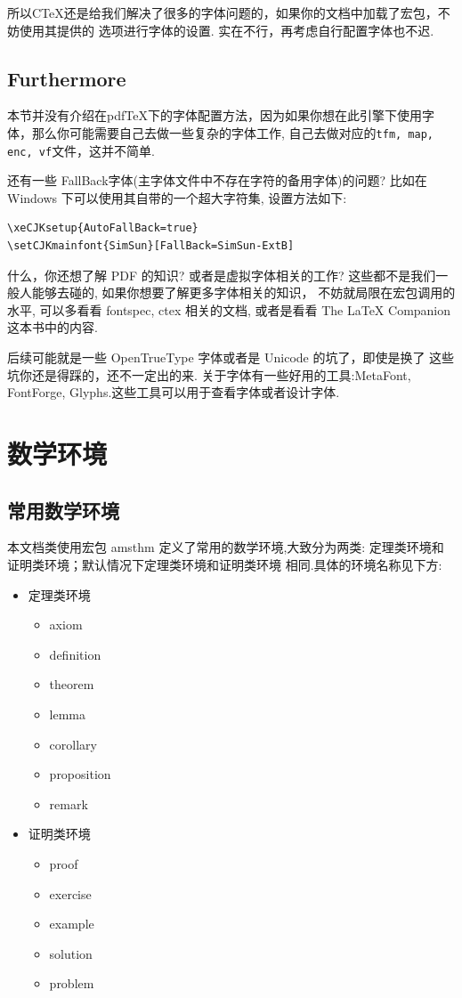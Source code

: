 所以C\TeX{}还是给我们解决了很多的字体问题的，如果你的文档中加载了宏包，不妨使用其提供的
选项进行字体的设置. 实在不行，再考虑自行配置字体也不迟.

\subsection{Furthermore}
本节并没有介绍在pdf\TeX{}下的字体配置方法，因为如果你想在此引擎下使用字体，那么你可能需要自己去做一些复杂的字体工作,
自己去做对应的\texttt{tfm, map, enc, vf}文件，这并不简单. 

还有一些 FallBack字体(主字体文件中不存在字符的备用字体)的问题? 比如在 Windows 下可以使用其自带的一个超大字符集,
设置方法如下:
\begin{verbatim}
\xeCJKsetup{AutoFallBack=true}
\setCJKmainfont{SimSun}[FallBack=SimSun-ExtB]
\end{verbatim}

什么，你还想了解 PDF 的知识? 或者是虚拟字体相关的工作? 这些都不是我们一般人能够去碰的, 如果你想要了解更多字体相关的知识，
不妨就局限在宏包调用的水平, 可以多看看 {fontspec, ctex} 相关的文档, 或者是看看 {The \LaTeX{} Companion} 这本书中的内容.

后续可能就是一些 OpenTrueType 字体或者是 Unicode 的坑了，即使是换了  这些坑你还是得踩的，还不一定出的来. 
关于字体有一些好用的工具:MetaFont, FontForge, Glyphs.这些工具可以用于查看字体或者设计字体.

\section{数学环境}
\subsection{常用数学环境}\label{常用数学环境}
本文档类使用宏包 {amsthm} 定义了常用的数学环境,大致分为两类: 定理类环境和证明类环境；默认情况下定理类环境和证明类环境
相同.具体的环境名称见下方:

\begin{itemize}
    \item 定理类环境
        \begin{itemize}
        \item axiom
        \item definition
        \item theorem 
        \item lemma
        \item corollary 
        \item proposition
        \item remark 
        \end{itemize}
    \item 证明类环境
    \begin{itemize}
        \item proof
        \item exercise
        \item example
        \item solution
        \item problem
    \end{itemize}
\end{itemize}    

